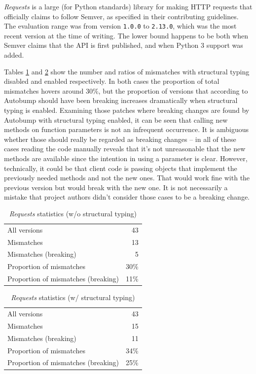 \documentclass{l4proj}
\newcommand\genericstyle{\lstset{basicstyle=\ttm}}
\newcommand\codeinline[1]{{\genericstyle\lstinline!#1!}}
\begin{document}
\textit{Requests} \cite{Requests} is a large (for Python standards) library for
making HTTP requests that officially claims to follow Semver, as
specified in their contributing guidelines. The evaluation range was
from version \codeinline{1.0.0} to \codeinline{2.13.0}, which was the
most recent version at the time of writing. The lower bound happens to
be both when Semver claims that the API is first published, and when
Python 3 support was added.

Tables \ref{RequestsNonStructural} and \ref{RequestsStructural} show
the number and ratios of mismatches with structural typing disabled
and enabled respectively. In both cases the proportion of total
mismatches hovers around 30\%, but the proportion of versions that
according to Autobump should have been breaking increases dramatically
when structural typing is enabled. Examining those patches where
breaking changes are found by Autobump with structural typing enabled,
it can be seen that calling new methods on function parameters is not
an infrequent occurrence. It is ambiguous whether those should really
be regarded as breaking changes -- in all of these cases reading the
code manually reveals that it's not unreasonable that the new methods
are available since the intention in using a parameter is clear.
However, technically, it could be that client code is passing objects
that implement the previously needed methods and not the new ones.
That would work fine with the previous version but would break with
the new one. It is not necessarily a mistake that project authors
didn't consider those cases to be a breaking change.

\noindent
\begin{minipage}[t]{0.5\textwidth}
\begin{table}[H]
\centering
\begin{tabular}{|lr|}
All versions & 43 \\
Mismatches & 13 \\
Mismatches (breaking) & 5 \\
Proportion of mismatches & 30\% \\
Proportion of mismatches (breaking) & 11\%
\end{tabular}
\caption{\textit{Requests} statistics (w/o structural typing)}
\label{RequestsNonStructural}
\end{table}
\end{minipage}
\begin{minipage}[t]{0.5\textwidth}
\begin{table}[H]
\centering
\begin{tabular}{|lr|}
All versions & 43 \\
Mismatches & 15 \\
Mismatches (breaking) & 11 \\
Proportion of mismatches & 34\% \\
Proportion of mismatches (breaking) & 25\%
\end{tabular}
\caption{\textit{Requests} statistics (w/ structural typing)}
\label{RequestsStructural}
\end{table}
\end{minipage}
\end{document}
